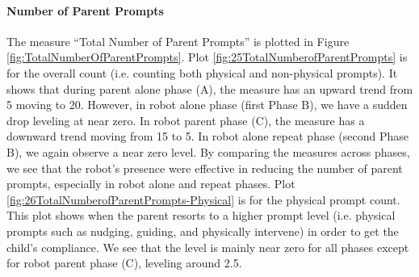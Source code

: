 \documentclass{ut-thesis}
\begin{document}
\paragraph{Number of Parent Prompts}
The measure ``Total Number of Parent Prompts'' is plotted in Figure \ref{fig:TotalNumberOfParentPrompts}.  Plot \ref{fig:25TotalNumberofParentPrompts} is for the overall count (i.e. counting both physical and non-physical prompts).  It shows that during parent alone phase (A), the measure has an upward trend from 5 moving to 20.  However, in robot alone phase (first Phase B), we have a sudden drop leveling at near zero.  In robot parent phase (C), the measure has a downward trend moving from 15 to 5.  In robot alone repeat phase (second Phase B), we again observe a near zero level.  By comparing the measures across phases, we see that the robot's presence were effective in reducing the number of parent prompts, especially in robot alone and repeat phases.  Plot \ref{fig:26TotalNumberofParentPrompts-Physical} is for the physical prompt count.  This plot shows when the parent resorts to a higher prompt level (i.e. physical prompts such as nudging, guiding, and physically intervene) in order to get the child's compliance.  We see that the level is mainly near zero for all phases except for robot parent phase (C), leveling around 2.5.
\end{document}
